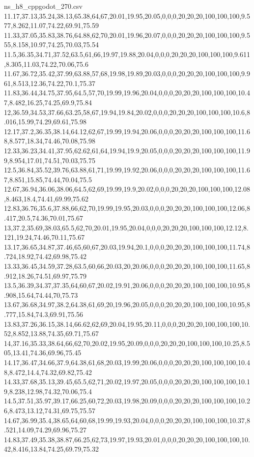 \begin{filecontents*}[overwrite]{ns_h8_cppgodot_270.csv}
11.17,37.13,35.24,38.13,65.38,64,67,20.01,19.95,20.05,0,0,0,20,20,20,100,100,100,9.577,8.262,11.07,74.22,69.91,75.59
11.33,37.05,35.83,38.76,64.88,62,70,20.01,19.96,20.07,0,0,0,20,20,20,100,100,100,9.555,8.158,10.97,74.25,70.03,75.54
11.5,36.35,34.71,37.52,63.5,61,66,19.97,19.88,20.04,0,0,0,20,20,20,100,100,100,9.611,8.305,11.03,74.22,70.06,75.6
11.67,36.72,35.42,37.99,63.88,57,68,19.98,19.89,20.03,0,0,0,20,20,20,100,100,100,9.961,8.513,12.36,74.22,70.1,75.37
11.83,36.44,34.75,37.95,64.5,57,70,19.99,19.96,20.04,0,0,0,20,20,20,100,100,100,10.47,8.482,16.25,74.25,69.9,75.84
12,36.59,34.53,37.66,63.25,58,67,19.94,19.84,20.02,0,0,0,20,20,20,100,100,100,10.6,8.016,15.99,74.29,69.61,75.98
12.17,37.2,36.35,38.14,64.12,62,67,19.99,19.94,20.06,0,0,0,20,20,20,100,100,100,11.68,8.577,18.34,74.46,70.08,75.98
12.33,36.23,34.41,37.95,62.62,61,64,19.94,19.9,20.05,0,0,0,20,20,20,100,100,100,11.99,8.954,17.01,74.51,70.03,75.75
12.5,36.84,35.52,39.76,63.88,61,71,19.99,19.92,20.06,0,0,0,20,20,20,100,100,100,11.67,8.851,15.85,74.44,70.04,75.5
12.67,36.94,36.06,38.06,64.5,62,69,19.99,19.9,20.02,0,0,0,20,20,20,100,100,100,12.08,8.463,18.4,74.41,69.99,75.62
12.83,36.76,35.6,37.88,66,62,70,19.99,19.95,20.03,0,0,0,20,20,20,100,100,100,12.06,8.417,20.5,74.36,70.01,75.67
13,37.2,35.69,38.03,65.5,62,70,20.01,19.95,20.04,0,0,0,20,20,20,100,100,100,12.12,8.121,19.24,74.46,70.11,75.67
13.17,36.65,34.87,37.46,65,60,67,20.03,19.94,20.1,0,0,0,20,20,20,100,100,100,11.74,8.724,18.92,74.42,69.98,75.42
13.33,36.45,34.59,37.28,63.5,60,66,20.03,20,20.06,0,0,0,20,20,20,100,100,100,11.65,8.912,18.26,74.51,69.97,75.79
13.5,36.39,34.37,37.35,64,60,67,20.02,19.91,20.06,0,0,0,20,20,20,100,100,100,10.95,8.908,15.64,74.44,70,75.73
13.67,36.68,34.97,38.2,64.38,61,69,20,19.96,20.05,0,0,0,20,20,20,100,100,100,10.95,8.777,15.84,74.3,69.91,75.56
13.83,37.26,36.15,38.14,66.62,62,69,20.04,19.95,20.11,0,0,0,20,20,20,100,100,100,10.52,8.852,13.88,74.35,69.71,75.67
14,37.16,35.33,38.64,66,62,70,20.02,19.95,20.09,0,0,0,20,20,20,100,100,100,10.25,8.505,13.41,74.36,69.96,75.45
14.17,36.47,34.66,37.9,64.38,61,68,20.03,19.99,20.06,0,0,0,20,20,20,100,100,100,10.48,8.472,14.4,74.32,69.82,75.42
14.33,37.68,35.13,39.45,65.5,62,71,20.02,19.97,20.05,0,0,0,20,20,20,100,100,100,10.19,8.238,12.98,74.32,70.06,75.4
14.5,37.51,35.97,39.17,66.25,60,72,20.03,19.98,20.09,0,0,0,20,20,20,100,100,100,10.26,8.473,13.12,74.31,69.75,75.57
14.67,36.99,35.4,38.65,64,60,68,19.99,19.93,20.04,0,0,0,20,20,20,100,100,100,10.37,8.521,14.09,74.29,69.96,75.27
14.83,37.49,35.38,38.87,66.25,62,73,19.97,19.93,20.01,0,0,0,20,20,20,100,100,100,10.42,8.416,13.84,74.25,69.79,75.32

\end{filecontents*}
